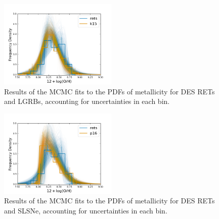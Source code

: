 \documentclass[fleqn,usenatbib,]{mnras}
\begin{document}
\begin{figure}
\includegraphics[width=0.5\textwidth]{mc_figs/rets_k15_OH_histfit_final.png}
\caption{Results of the MCMC fits to the PDFs of metallicity for DES RETs and LGRBs, accounting for uncertainties in each bin.
\label{fig:histfit}}
\end{figure}

\begin{figure}
\includegraphics[width=0.5\textwidth]{mc_figs/rets_p16_OH_histfit_final.png}
\caption{Results of the MCMC fits to the PDFs of metallicity for DES RETs and SLSNe, accounting for uncertainties in each bin.
\label{fig:histfit}}
\end{figure}


\bsp	%
\label{lastpage}
\end{document}
